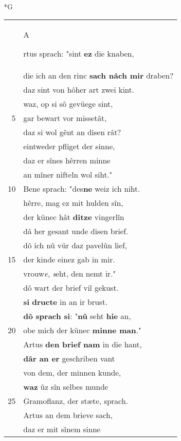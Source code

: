 \documentclass[8pt,a4paper,notitlepage]{article}
\begin{document}
\begin{table}[ht]
\begin{minipage}[t]{0.5\linewidth}
\small
\begin{center}*G
\end{center}
\begin{tabular}{rl}
 & \begin{large}A\end{large}rtus sprach: "sint \textbf{ez} die knaben,\\ 
 & die ich an den rinc \textbf{sach nâch mir} draben?\\ 
 & daz sint von hôher art zwei kint.\\ 
 & waz, op si sô gevüege sint,\\ 
5 & gar bewart vor missetât,\\ 
 & daz si wol gênt an disen rât?\\ 
 & eintweder pfliget der sinne,\\ 
 & daz er sînes hêrren minne\\ 
 & an mîner nifteln wol siht."\\ 
10 & Bene sprach: "des\textbf{ne} weiz ich niht.\\ 
 & hêrre, mag ez mit hulden sîn,\\ 
 & der künec hât \textbf{ditze} vingerlîn\\ 
 & dâ her gesant unde disen brief.\\ 
 & dô ich nû vür daz pavelûn lief,\\ 
15 & der kinde einez gab in mir.\\ 
 & vrouw\textit{e}, \textit{s}eht, den nemt ir."\\ 
 & dô wart der brief vil gekust.\\ 
 & \textbf{si} \textbf{dructe} in an ir brust.\\ 
 & \textbf{dô sprach si}: "\textbf{nû} seht \textbf{hie} an,\\ 
20 & obe mich der künec \textbf{minne man}."\\ 
 & Artus \textbf{den brief nam} in die hant,\\ 
 & \textbf{dâr an er} geschriben vant\\ 
 & von dem, der minnen kunde,\\ 
 & \textbf{waz} ûz sîn selbes munde\\ 
25 & Gramoflanz, der stæte, sprach.\\ 
 & Artus an dem brieve sach,\\ 
 & daz er mit sînem sinne\\ 

\end{tabular}
\end{minipage}
\end{table}
\end{document}

